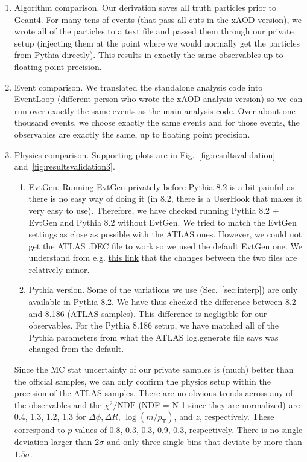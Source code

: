 \documentclass[UKenglish,texlive=2013]{\ATLASLATEXPATH atlasdoc}
\begin{document}
\begin{enumerate}
\item Algorithm comparison.  Our derivation saves all truth particles prior to Geant4.  For many tens of events (that pass all cuts in the xAOD version), we wrote all of the particles to a text file and passed them through our private setup (injecting them at the point where we would normally get the particles from Pythia directly).  This results in exactly the same observables up to floating point precision.
\item Event comparison.  We translated the standalone analysis code into EventLoop (different person who wrote the xAOD analysis version) so we can run over exactly the same events as the main analysis code.  Over about one thousand events, we choose exactly the same events and for those events, the observables are exactly the same, up to floating point precision.
\item Physics comparison.  Supporting plots are in Fig.~\ref{fig:resultsvalidation} and~\ref{fig:resultsvalidation3}.
\begin{enumerate}
	\item EvtGen.  Running EvtGen privately before Pythia 8.2 is a bit painful as there is no easy way of doing it (in 8.2, there is a UserHook that makes it very easy to use).  Therefore, we have checked running Pythia 8.2 + EvtGen and Pythia 8.2 without EvtGen.  We tried to match the EvtGen settings as close as possible with the ATLAS ones.  However, we could not get the ATLAS .DEC file to work so we used the default EvtGen one.  We understand from e.g. \href{https://indico.cern.ch/event/537435/contributions/2184669/attachments/1286455/1913828/EvtGen_ATLAS.pdf}{this link} that the changes between the two files are relatively minor.
	\item Pythia version.  Some of the variations we use (Sec.~\ref{sec:interp}) are only available in Pythia 8.2.  We have thus checked the difference between 8.2 and 8.186 (ATLAS samples).  This difference is negligible for our observables.  For the Pythia 8.186 setup, we have matched all of the Pythia parameters from what the ATLAS log.generate file says was changed from the default.
\end{enumerate}
Since the MC stat uncertainty of our private samples is (much) better than the official samples, we can only confirm the physics setup within the precision of the ATLAS samples.   There are no obvious trends across any of the observables and the $\chi^2/\text{NDF}$ (NDF = N-1 since they are normalized) are 0.4, 1.3, 1.2, 1.3 for $\Delta\phi, \Delta R$, $\log(m/p_\text{T})$, and $z$, respectively.   These correspond to $p$-values of 0.8, 0.3, 0.3, 0.9, 0.3, respectively.  There is no single deviation larger than $2\sigma$ and only three single bins that deviate by more than $1.5\sigma$.
\end{enumerate}
\end{document}
